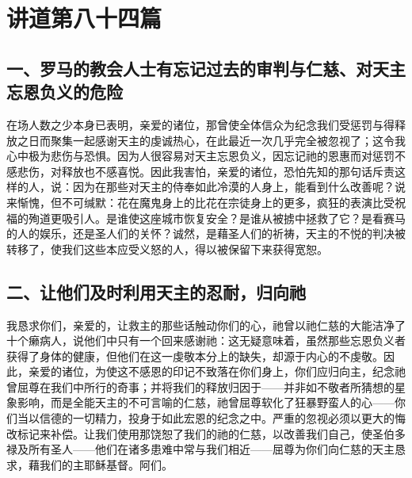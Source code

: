 \section{讲道第八十四篇}

\par


\subsection{一、罗马的教会人士有忘记过去的审判与仁慈、对天主忘恩负义的危险}

在场人数之少本身已表明，亲爱的诸位，那曾使全体信众为纪念我们受惩罚与得释放之日而聚集一起感谢天主的虔诚热心，在此最近一次几乎完全被忽视了；这令我心中极为悲伤与恐惧。因为人很容易对天主忘恩负义，因忘记祂的恩惠而对惩罚不感悲伤，对释放也不感喜悦。因此我害怕，亲爱的诸位，恐怕先知的那句话斥责这样的人，说：因为在那些对天主的侍奉如此冷漠的人身上，能看到什么改善呢？说来惭愧，但不可缄默：花在魔鬼身上的比花在宗徒身上的更多，疯狂的表演比受祝福的殉道更吸引人。是谁使这座城市恢复安全？是谁从被掳中拯救了它？是看赛马的人的娱乐，还是圣人们的关怀？诚然，是藉圣人们的祈祷，天主的不悦的判决被转移了，使我们这些本应受义怒的人，得以被保留下来获得宽恕。\par


\subsection{二、让他们及时利用天主的忍耐，归向祂}

我恳求你们，亲爱的，让救主的那些话触动你们的心，祂曾以祂仁慈的大能洁净了十个癞病人，说他们中只有一个回来感谢祂：这无疑意味着，虽然那些忘恩负义者获得了身体的健康，但他们在这一虔敬本分上的缺失，却源于内心的不虔敬。因此，亲爱的诸位，为使这不感恩的印记不致落在你们身上，你们应归向主，纪念祂曾屈尊在我们中所行的奇事；并将我们的释放归因于——并非如不敬者所猜想的星象影响，而是全能天主的不可言喻的仁慈，祂曾屈尊软化了狂暴野蛮人的心——你们当以信德的一切精力，投身于如此宏恩的纪念之中。严重的忽视必须以更大的悔改标记来补偿。让我们使用那饶恕了我们的祂的仁慈，以改善我们自己，使圣伯多禄及所有圣人——他们在诸多患难中常与我们相近——屈尊为你们向仁慈的天主恳求，藉我们的主耶稣基督。阿们。\par

